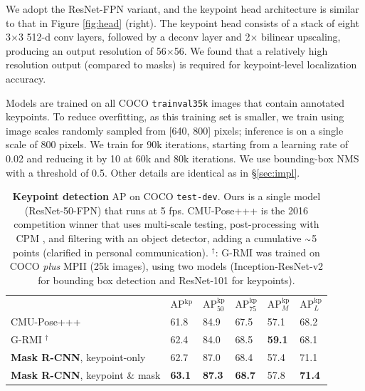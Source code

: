 \documentclass[10pt,twocolumn,letterpaper]{article}
\newcommand{\bd}[1]{\textbf{#1}}
\newcommand{\app}{\raise.17ex\hbox{$\scriptstyle\sim$}}
\def\x{\times}
\newcommand{\tablestyle}[2]{\setlength{\tabcolsep}{#1}\renewcommand{\arraystretch}{#2}\centering\footnotesize}
\begin{document}
We adopt the ResNet-FPN variant, and the keypoint head architecture is similar to that in Figure \ref{fig:head} (right). The keypoint head consists of a stack of eight 3$\x$3 512-d conv layers, followed by a deconv layer and 2$\x$ bilinear upscaling, producing an output resolution of 56$\x$56. We found that a relatively high resolution output (compared to masks) is required for keypoint-level localization accuracy.

Models are trained on all COCO \texttt{trainval35k} images that contain annotated keypoints. To reduce overfitting, as this training set is smaller, we train using image scales randomly sampled from [640, 800] pixels; inference is on a single scale of 800 pixels. We train for 90k iterations, starting from a learning rate of 0.02 and reducing it by 10 at 60k and 80k iterations. We use bounding-box NMS with a threshold of 0.5. Other details are identical as in \S\ref{sec:impl}.

\begin{table}[t]
\tablestyle{1.8pt}{1.2}
\begin{tabular}{l|x{22}x{22}x{22}|x{22}x{22}}
 & AP$^\text{kp}$ & AP$^\text{kp}_{50}$ & AP$^\text{kp}_{75}$
 & AP$^\text{kp}_M$ &  AP$^\text{kp}_L$\\ [.1em]
\shline
CMU-Pose+++ \cite{Cao2017} & 61.8 & 84.9 & 67.5 & 57.1 & 68.2 \\
G-RMI \cite{Papandreou2017}$^\dagger$ & 62.4 & 84.0 & 68.5 & \bd{59.1} & 68.1 \\
\hline
 \bd{Mask R-CNN}, \footnotesize keypoint-only & 62.7 & 87.0 & 68.4 & 57.4 & 71.1 \\
 \bd{Mask R-CNN}, \footnotesize keypoint \& mask & \bd{63.1} & \bd{87.3} & \bd{68.7} & {57.8} & \bd{71.4} \\
\end{tabular}\vspace{2mm}
\caption{\textbf{Keypoint detection} AP on COCO \texttt{test-dev}. Ours is a single model (ResNet-50-FPN) that runs at 5 fps. CMU-Pose+++ \cite{Cao2017} is the 2016 competition winner that uses multi-scale testing, post-processing with CPM \cite{Wei2016}, and filtering with an object detector, adding a cumulative $\app$5 points (clarified in personal communication). $^\dagger$: G-RMI was trained on COCO \emph{plus} MPII \cite{Andriluka2014} (25k images), using two models (Inception-ResNet-v2 for bounding box detection and ResNet-101 for keypoints).}
\label{tab:final_keypoint}\vspace{-2mm}
\end{table}
\end{document}
